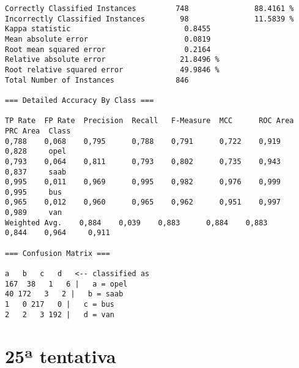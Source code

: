 \documentclass[
	article,			%
	11pt,				%
	oneside,			%
	a4paper,			%
	english,			%
	brazil,				%
	sumario=tradicional
	]{abntex2}
\begin{document}
\begin{lstlisting}
Correctly Classified Instances         748               88.4161 %
Incorrectly Classified Instances        98               11.5839 %
Kappa statistic                          0.8455
Mean absolute error                      0.0819
Root mean squared error                  0.2164
Relative absolute error                 21.8496 %
Root relative squared error             49.9846 %
Total Number of Instances              846     

=== Detailed Accuracy By Class ===

TP Rate  FP Rate  Precision  Recall   F-Measure  MCC      ROC Area  PRC Area  Class
0,788    0,068    0,795      0,788    0,791      0,722    0,919     0,828     opel
0,793    0,064    0,811      0,793    0,802      0,735    0,943     0,837     saab
0,995    0,011    0,969      0,995    0,982      0,976    0,999     0,995     bus
0,965    0,012    0,960      0,965    0,962      0,951    0,997     0,989     van
Weighted Avg.    0,884    0,039    0,883      0,884    0,883      0,844    0,964     0,911     

=== Confusion Matrix ===

a   b   c   d   <-- classified as
167  38   1   6 |   a = opel
40 172   3   2 |   b = saab
1   0 217   0 |   c = bus
2   2   3 192 |   d = van

\end{lstlisting}

\newpage

\section{25ª tentativa}
\end{document}
